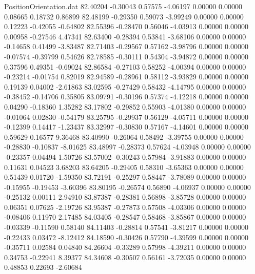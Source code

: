 \begin{filecontents}{PositionOrientation.dat}
  82.40204   -0.30043    0.57575    -4.06197    0.00000    0.00000    0.08665    0.18732    0.86899
  82.48199   -0.29350    0.59073    -3.99249    0.00000    0.00000    0.12223   -0.42055   -0.64802
  82.55396   -0.28470    0.56046    -4.03913    0.00000    0.00000    0.00958   -0.27546    4.47341
  82.63400   -0.28394    0.53841    -3.68106    0.00000    0.00000   -0.14658    0.41499   -3.83487
  82.71403   -0.29567    0.57162    -3.98796    0.00000    0.00000   -0.07574   -0.39799    0.54626
  82.78585   -0.30111    0.54304    -3.94872    0.00000    0.00000    0.37596    0.49351   -0.69024
  82.86584   -0.27103    0.58252    -4.00394    0.00000    0.00000   -0.23214   -0.01754    0.82019
  82.94589   -0.28961    0.58112    -3.93829    0.00000    0.00000    0.19139    0.04002   -2.61863
  83.02595   -0.27429    0.58432    -4.14795    0.00000    0.00000   -0.38452   -0.14706    0.35805
  83.09791   -0.30196    0.57374    -4.12218    0.00000    0.00000    0.04290   -0.18360    1.35282
  83.17802   -0.29852    0.55903    -4.01380    0.00000    0.00000   -0.01064    0.02830   -0.54179
  83.25795   -0.29937    0.56129    -4.05711    0.00000    0.00000   -0.12399    0.14417   -1.23437
  83.32997   -0.30830    0.57167    -4.14601    0.00000    0.00000    0.59629    0.16577    9.36468
  83.40990   -0.26064    0.58492    -3.39755    0.00000    0.00000   -0.28830   -0.10837   -8.01625
  83.48997   -0.28373    0.57624    -4.03948    0.00000    0.00000   -0.23357    0.04494    1.50726
  83.57002   -0.30243    0.57984    -3.91883    0.00000    0.00000    0.11631    0.04523    3.68203
  83.64205   -0.29405    0.58310    -3.65363    0.00000    0.00000    0.51439    0.01720   -1.59350
  83.72191   -0.25297    0.58447    -3.78089    0.00000    0.00000   -0.15955   -0.19453   -3.60396
  83.80195   -0.26574    0.56890    -4.06937    0.00000    0.00000   -0.25132    0.00111    2.94910
  83.87387   -0.28381    0.56898    -3.85728    0.00000    0.00000    0.06351    0.07625   -2.19726
  83.95387   -0.27873    0.57508    -4.03306    0.00000    0.00000   -0.08406    0.11970    2.17485
  84.03405   -0.28547    0.58468    -3.85867    0.00000    0.00000   -0.03339   -0.11590    0.58140
  84.11403   -0.28814    0.57541    -3.81217    0.00000    0.00000   -0.22433    0.03472   -8.12412
  84.18590   -0.30426    0.57790    -4.39599    0.00000    0.00000   -0.35711    0.02584    0.04840
  84.26604   -0.33289    0.57998    -4.39211    0.00000    0.00000    0.34753   -0.22941    8.39377
  84.34608   -0.30507    0.56161    -3.72035    0.00000    0.00000    0.48853    0.22693   -2.60684

\end{filecontents}
